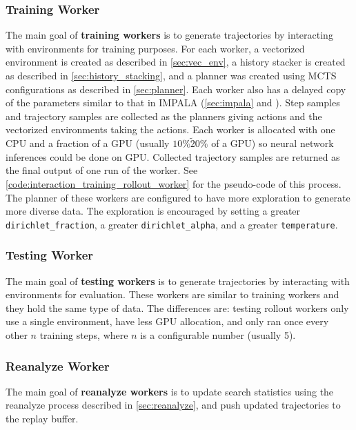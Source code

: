 \subsubsection{Training Worker} \label{sec:train_rw}
The main goal of \textbf{training workers} is to generate trajectories by interacting with environments for training purposes.
For each worker, a vectorized environment is created as described in \ref{sec:vec_env}, a history stacker is created as described in \ref{sec:history_stacking}, and a planner was created using MCTS configurations as described in \ref{sec:planner}.
Each worker also has a delayed copy of the parameters similar to that in IMPALA (\ref{sec:impala} and \cite{IMPALAScalableDistributed_Espeholt.Soyer.ea_2018}).
Step samples and trajectory samples are collected as the planners giving actions and the vectorized environments taking the actions.
Each worker is allocated with one CPU and a fraction of a GPU (usually $10\% \tilde 20\%$ of a GPU) so neural network inferences could be done on GPU.
Collected trajectory samples are returned as the final output of one run of the worker.
See \ref{code:interaction_training_rollout_worker} for the pseudo-code of this process.
The planner of these workers are configured to have more exploration to generate more diverse data.
The exploration is encouraged by setting a greater \Verb|dirichlet_fraction|, a greater \Verb|dirichlet_alpha|, and a greater \Verb|temperature|. 

\subsubsection{Testing Worker} \label{sec:test_rw}
The main goal of \textbf{testing workers} is to generate trajectories by interacting with environments for evaluation.
These workers are similar to training workers and they hold the same type of data.
The differences are: testing rollout workers only use a single environment, have less GPU allocation, and only ran once every other $n$ training steps, where $n$ is a configurable number (usually 5).

\subsubsection{Reanalyze Worker} \label{sec:re_w}
The main goal of \textbf{reanalyze workers} is to update search statistics using the reanalyze process described in \ref{sec:reanalyze}, and push updated trajectories to the replay buffer.

